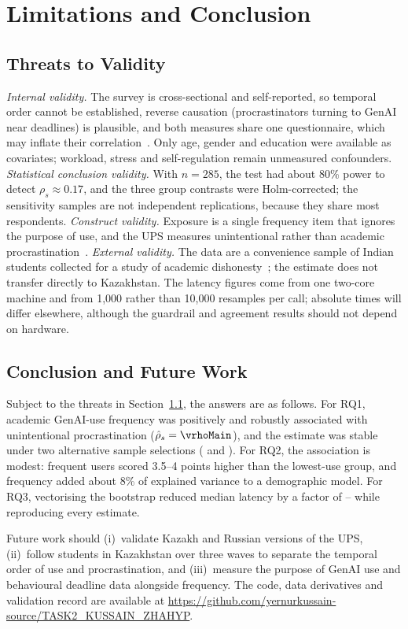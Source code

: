 \section{Limitations and Conclusion}\label{sec:conclusion}

\subsection{Threats to Validity}\label{sec:threats}
\emph{Internal validity.} The survey is cross-sectional and self-reported, so temporal order cannot be established, reverse causation (procrastinators turning to GenAI near deadlines) is plausible, and both measures share one questionnaire, which may inflate their correlation~\cite{podsakoff2003common}. Only age, gender and education were available as covariates; workload, stress and self-regulation remain unmeasured confounders. \emph{Statistical conclusion validity.} With $n=285$, the test had about 80\% power to detect $\rho_s\approx0.17$, and the three group contrasts were Holm-corrected; the sensitivity samples are not independent replications, because they share most respondents. \emph{Construct validity.} Exposure is a single frequency item that ignores the purpose of use, and the UPS measures unintentional rather than academic procrastination~\cite{fernie2017ups}. \emph{External validity.} The data are a convenience sample of Indian students collected for a study of academic dishonesty~\cite{sharma2026dataset}; the estimate does not transfer directly to Kazakhstan. The latency figures come from one two-core machine and from 1{,}000 rather than 10{,}000 resamples per call; absolute times will differ elsewhere, although the guardrail and agreement results should not depend on hardware.

\subsection{Conclusion and Future Work}
Subject to the threats in Section~\ref{sec:threats}, the answers are as follows. For RQ1, academic GenAI-use frequency was positively and robustly associated with unintentional procrastination ($\hat\rho_s=\vrhoMain$), and the estimate was stable under two alternative sample selections (\vrhoA{} and \vrhoB). For RQ2, the association is modest: frequent users scored 3.5--4 points higher than the lowest-use group, and frequency added about 8\% of explained variance to a demographic model. For RQ3, vectorising the bootstrap reduced median latency by a factor of \vspeedMin--\vspeedMax{} while reproducing every estimate.

Future work should (i)~validate Kazakh and Russian versions of the UPS, (ii)~follow students in Kazakhstan over three waves to separate the temporal order of use and procrastination, and (iii)~measure the purpose of GenAI use and behavioural deadline data alongside frequency. The code, data derivatives and validation record are available at \url{https://github.com/yernurkussain-source/TASK2_KUSSAIN_ZHAHYP}.
